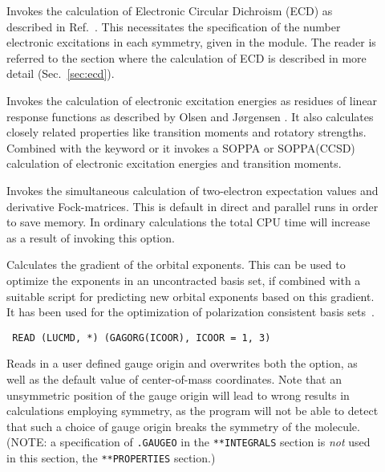 \begin{description}
\item[] Invokes the calculation of Electronic Circular
Dichroism (ECD) as
described in Ref.~\cite{klbaehkrthjopjtca90,mpkrthcpl388}. This
necessitates the specification of the number electronic
excitations in
each symmetry, given in the  module. The reader is
referred to the section where the calculation of ECD is described in
more detail (Sec.~\ref{sec:ecd}).

\item[] Invokes the calculation of electronic
excitation
energies as residues of linear response functions
as described by Olsen and J\o rgensen \cite{jopjjcp82}. It also
calculates closely related properties like transition
moments and
rotatory strengths. Combined with the
keyword  or  it invokes a SOPPA
or SOPPA(CCSD) calculation of electronic
excitation energies and transition moments.


\item[] Invokes the simultaneous calculation of
two-electron expectation values and derivative Fock-matrices. This is
default in direct and parallel runs in order to save memory. In
ordinary calculations the total CPU time will increase as a result of
invoking this option.

\item[] Calculates the gradient of the orbital
  exponents. This can be used to optimize the exponents in an
  uncontracted basis set, if combined with a suitable script for
  predicting new orbital exponents based on this gradient.
  It has been used for the optimization of polarization consistent basis
  sets~\cite{fjjcp115}.

\item[]\verb| |\newline
\verb|READ (LUCMD, *) (GAGORG(ICOOR), ICOOR = 1, 3)|

Reads in a user defined gauge origin and overwrites
both the  option, as well as the default value of
center-of-mass coordinates. Note that an unsymmetric position of the
gauge origin will lead to wrong results in calculations employing
symmetry, as the program will not be able to detect that such a choice
of gauge origin breaks the symmetry of the molecule.
(NOTE: a specification of \verb|.GAUGEO| in the \verb|**INTEGRALS| section
is \emph{not} used in this section, the \verb|**PROPERTIES| section.)


\end{description}
